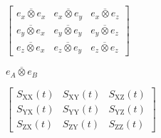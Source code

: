 \documentclass[a4paper,11pt,twoside,openright]{book}
\def\lthtmlcheckvsize{\ifdim\ht\sizebox<\vsize 
  \ifdim\wd\sizebox<\hsize\expandafter\hfill\fi \expandafter\vfill
  \else\expandafter\vss\fi}%
\begin{document}
{\newpage\clearpage
{}%
$\displaystyle \begin{bmatrix}
\overline{e_x \otimes e_x} & \overline{e_x \otimes e_y} & \overline{e_x \otimes e_z} \\
\overline{e_y \otimes e_x} & \overline{e_y \otimes e_y} & \overline{e_y \otimes e_z} \\
\overline{e_z \otimes e_x} & \overline{e_z \otimes e_y} & \overline{e_z \otimes e_z}
\end{bmatrix}$%
\lthtmlindisplaymathZ
\lthtmlcheckvsize\clearpage}

{\newpage\clearpage
{}%
$\displaystyle \overline{{e_A \otimes e_B}}$%
\lthtmlindisplaymathZ
\lthtmlcheckvsize\clearpage}

{\newpage\clearpage
{}%
$\displaystyle \begin{bmatrix}
S_{\textrm{XX}}(t) & S_{\textrm{XY}}(t) & S_{\textrm{XZ}}(t) \\
S_{\textrm{YX}}(t) & S_{\textrm{YY}}(t) & S_{\textrm{YZ}}(t) \\
S_{\textrm{ZX}}(t) & S_{\textrm{ZY}}(t) & S_{\textrm{ZZ}}(t)
\end{bmatrix}$%
\lthtmlindisplaymathZ
\lthtmlcheckvsize\clearpage}



\setlength{\unitlength}{0.5cm}%
\end{document}
